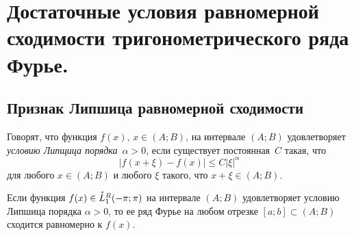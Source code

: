 \chapter{Достаточные условия равномерной сходимости тригонометрического ряда Фурье.}
\section{Признак Липшица равномерной сходимости}
Говорят, что функция $f(x)$, $x \in (A;B)$, на интервале $(A;B)$ удовлетворяет \textit{условию Липщица порядка}~$\alpha > 0$, если существует постоянная~$C$ такая, что
$$
|f(x+\xi) - f(x)| \le C|\xi|^{\alpha}
$$
для любого $x \in (A;B)$ и любого $\xi$ такого, что $x + \xi \in (A;B)$.

\begin{thm}  \label{ch18thm1}
Если функция $f(x) \in \accentset{*}{L}^{R}_1(-\pi;\pi)$ на интервале $(A;B)$ удовлетворяет условию Липшица порядка $\alpha > 0$, то ее ряд Фурье на любом отрезке $[a;b] \subset (A;B)$ сходится равномерно к $f(x)$.
\end{thm}

